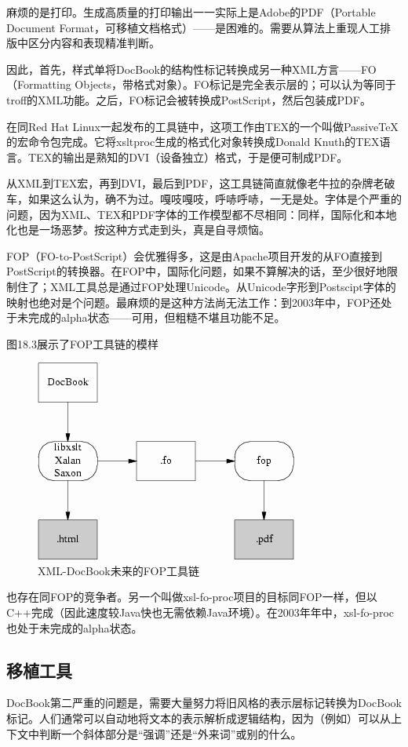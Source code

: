 \documentclass[12pt,oneside]{book}
\begin{document}
麻烦的是打印。生成高质量的打印输出一一实际上是Adobe的PDF（Portable Document Format，可移植文档格式）——是困难的。需要从算法上重现人工排版中区分内容和表现精准判断。

因此，首先，样式单将DocBook的结构性标记转换成另一种XML方言——FO（Formatting Objects，带格式对象）。FO标记是完全表示层的；可以认为等同于troff的XML功能。之后，FO标记会被转换成PostScript，然后包装成PDF。

在同Red Hat Linux一起发布的工具链中，这项工作由TEX的一个叫做PassiveTeX的宏命令包完成。它将xsltproc生成的格式化对象转换成Donald Knuth的TEX语言。TEX的输出是熟知的DVI（设备独立）格式，于是便可制成PDF。

从XML到TEX宏，再到DVI，最后到PDF，这工具链简直就像老牛拉的杂牌老破车，如果这么认为，确不为过。嘎吱嘎吱，呼哧呼哧，一无是处。字体是个严重的问题，因为XML、TEX和PDF字体的工作模型都不尽相同：同样，国际化和本地化也是一场恶梦。按这种方式走到头，真是自寻烦恼。

FOP（FO-to-PostScript）会优雅得多，这是由Apache项目开发的从FO直接到PostScript的转换器。在FOP中，国际化问题，如果不算解决的话，至少很好地限制住了；XML工具总是通过FOP处理Unicode。从Unicode字形到Postscipt字体的映射也绝对是个问题。最麻烦的是这种方法尚无法工作：到2003年中，FOP还处于未完成的alpha状态——可用，但粗糙不堪且功能不足。

图18.3展示了FOP工具链的模样

\begin{figure}[H]
\centering
\includegraphics[scale=1 , keepaspectratio]{docflow3.png}
\caption{XML-DocBook未来的FOP工具链}
\end{figure}


也存在同FOP的竞争者。另一个叫做xsl-fo-proc项目的目标同FOP一样，但以C++完成（因此速度较Java快也无需依赖Java环境）。在2003年年中，xsl-fo-proc也处于未完成的alpha状态。

\subsection{移植工具}
DocBook第二严重的问题是，需要大量努力将旧风格的表示层标记转换为DocBook标记。人们通常可以自动地将文本的表示解析成逻辑结构，因为（例如）可以从上下文中判断一个斜体部分是“强调”还是“外来词”或别的什么。
\end{document}
